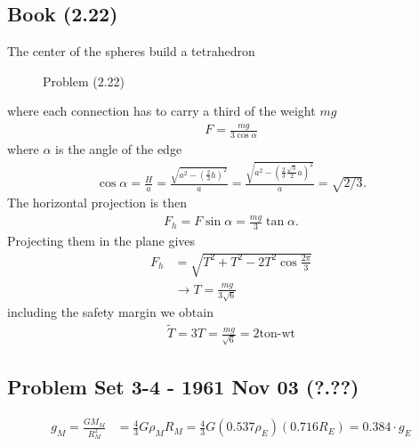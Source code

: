 \documentclass[../main.tex]{subfiles}
\begin{document}
\subsection{Book (2.22)}
The center of the spheres build a tetrahedron
\begin{figure}[!h]
\centering
{}
\caption{Problem (2.22)}
\end{figure}
where each connection has to carry a third of the weight $mg$
\begin{align}
F=\frac{mg}{3\cos\alpha}
\end{align}
where $\alpha$ is the angle of the edge
\begin{align}
\cos\alpha=\frac{H}{a}=\frac{\sqrt{a^2-\left(\frac{2}{3}h\right)^2}}{a}=\frac{\sqrt{a^2-\left(\frac{2}{3}\frac{\sqrt{3}}{2}a\right)^2}}{a}=\sqrt{2/3}.
\end{align}
The horizontal projection is then
\begin{align}
F_h=F\sin\alpha=\frac{mg}{3}\tan\alpha.
\end{align}
Projecting them in the plane gives
\begin{align}
F_h&=\sqrt{T^2+T^2-2T^2\cos\frac{2\pi}{3}}\\
&\rightarrow T=\frac{mg}{3\sqrt{6}}
\end{align}
including the safety margin we obtain
\begin{align}
\widetilde{T}=3T=\frac{mg}{\sqrt{6}}=2\text{ton-wt}
\end{align}


\subsection{Problem Set 3-4 - 1961 Nov 03 (?.??)}
\begin{align}
    g_M=\frac{GM_M}{R_M^2}&=\frac{4}{3}G\rho_M R_M=\frac{4}{3}G (0.537\rho_E) (0.716R_E)=0.384 \cdot g_E
\end{align}
\end{document}
